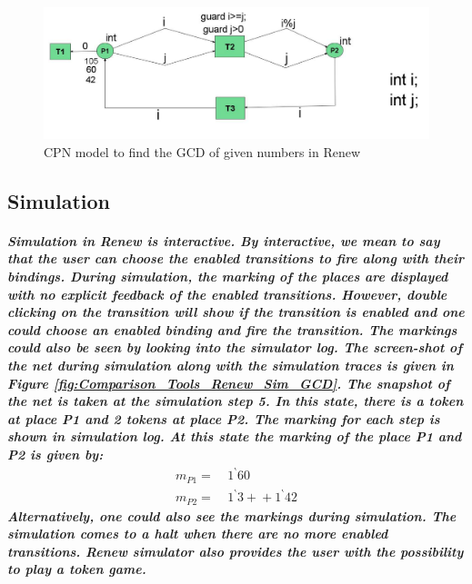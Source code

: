 \begin{figure}[!htbp]
	\centering
	\includegraphics[scale = 0.5]{Comparison_Tools_Renew_Net_GCD.pdf}
	\caption{CPN model to find the GCD of given numbers in Renew}
	\label{fig:Comparison_Tools_Renew_Net_GCD}
\end{figure}


\subsection*{Simulation}
\subparagraph*{\textnormal{Simulation in Renew is interactive. By interactive, we mean to say that the user can choose the enabled transitions to fire along with their bindings. During simulation, the marking of the places are displayed with no explicit feedback of the enabled transitions. However, double clicking on the transition will show if the transition is enabled and one could choose an enabled binding and fire the transition. The markings could also be seen by looking into the simulator log. The screen-shot of the net during simulation along with the simulation traces is given in Figure \ref{fig:Comparison_Tools_Renew_Sim_GCD}. The snapshot of the net is taken at the simulation step 5. In this state, there is a token at place \textit{P1} and 2 tokens at place \textit{P2}. The marking for each step is shown in simulation log. At this state the marking of the place \textit{P1} and \textit{P2} is given by:
\begin{equation*}
\begin{aligned}
m_{P1} =\ & 1^{\backprime}60\\
m_{P2} =\ & 1^{\backprime}3 +\!\!+ 1^{\backprime}42
\end{aligned}
\end{equation*}
Alternatively, one could also see the markings during simulation. The simulation comes to a halt when there are no more enabled transitions. Renew simulator also provides the user with the possibility to play a token game.}}

